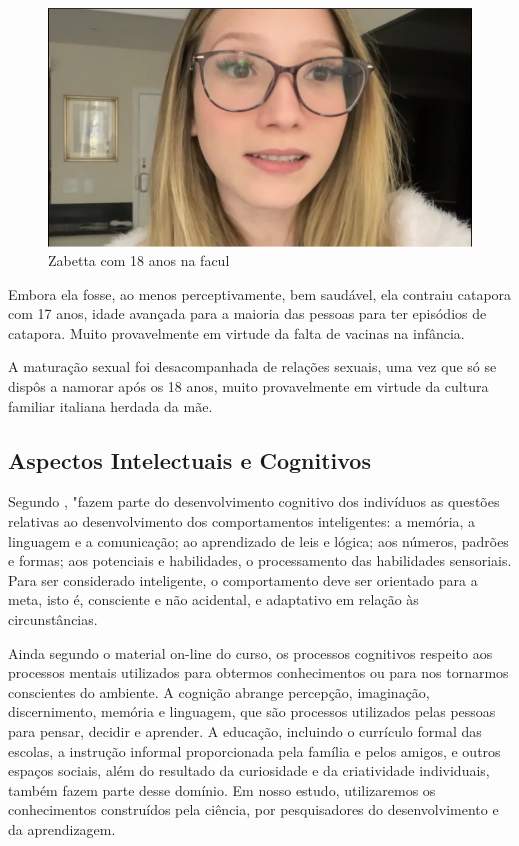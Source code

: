 \begin{figure}[h!]
    \centering
    \includegraphics[width=0.7\linewidth]{fig/Zabetta-18-anos-facul}
    \caption{Zabetta com 18 anos na facul}
    \label{fig:zabetta-18-anos-facul}
\end{figure}


Embora ela fosse, ao menos perceptivamente, bem saudável, ela contraiu catapora com 17 anos, idade avançada para a maioria das pessoas para ter episódios de catapora. Muito provavelmente em virtude da falta de vacinas na infância.

A maturação sexual foi desacompanhada de relações sexuais, uma vez que só se dispôs a namorar após os 18 anos, muito provavelmente em virtude da cultura familiar italiana herdada da mãe.



\subsection{Aspectos Intelectuais e Cognitivos}

Segundo , "fazem parte do desenvolvimento cognitivo dos indivíduos as questões relativas ao desenvolvimento dos comportamentos inteligentes: a memória, a linguagem e a comunicação; ao aprendizado de leis e lógica; aos números, padrões e formas; aos potenciais e habilidades, o processamento das habilidades sensoriais. Para ser considerado inteligente, o comportamento deve ser orientado para a meta, isto é, consciente e não acidental, e adaptativo em relação às circunstâncias.

Ainda segundo o material on-line do curso, os processos cognitivos respeito aos processos mentais utilizados para obtermos conhecimentos ou para nos tornarmos conscientes do ambiente. A cognição abrange percepção, imaginação, discernimento, memória e linguagem, que são processos utilizados pelas pessoas para pensar, decidir e aprender.  A educação, incluindo o currículo formal das escolas, a instrução informal proporcionada pela família e pelos amigos, e outros espaços sociais, além do resultado da curiosidade e da criatividade individuais, também fazem parte desse domínio.
Em nosso estudo, utilizaremos os conhecimentos construídos pela ciência, por pesquisadores do desenvolvimento e da aprendizagem.

